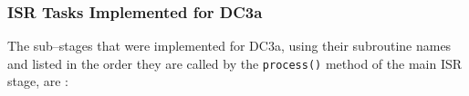 

\subsubsection{ISR Tasks Implemented for DC3a}

The sub--stages that were implemented for DC3a, using their subroutine
names and listed in the order they are called by the {\tt process()}
method of the main ISR stage, are :

